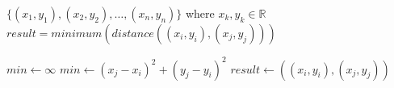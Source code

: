   \REQUIRE $\{(x_1, y_1), (x_2, y_2), \ldots, (x_n, y_n)\}$ where $x_k, y_k \in \mathbb{R}$
  \ENSURE $result = minimum(distance((x_i, y_i), (x_j, y_j)))$

  \STATE $min \leftarrow \infty$   
            \STATE $min \leftarrow (x_j - x_i)^2 + (y_j - y_i)^2$
            \STATE $result \leftarrow ((x_i, y_i), (x_j, y_j))$
        \ENDIF
     \ENDFOR
  \ENDFOR
